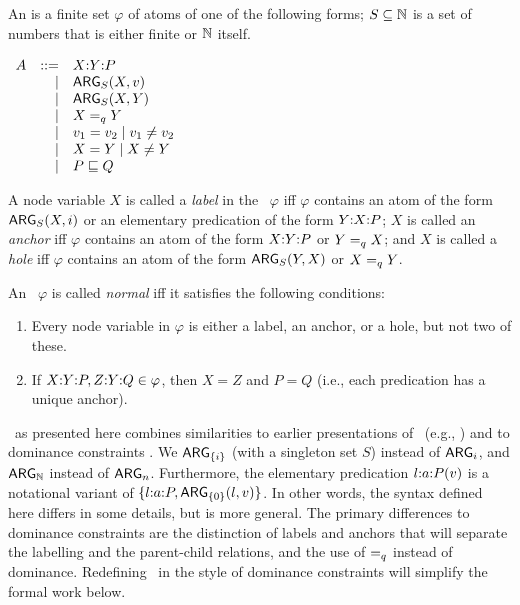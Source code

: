 \begin{definition}\label{defn:rmrs-syntax}
  An \emph{\rmrs} is a finite set $\varphi$ of atoms of one of the
  following forms; $S \subseteq \mathbb{N}$ is a set of numbers that is either
  finite or $\mathbb{N}$ itself.

$\begin{array}{rrll}
A &::= &\ep{X}{Y}{P} \\ %
&| &\ARG_S(X,v) \\ %
&| &\ARG_S(X,Y) \\ %
&| &X \qeq Y \\ %
&| &v_1 = v_2 \;|\; v_1 \neq v_2 \\ %
&| &X = Y \;|\; X \neq Y \\ %
&| &P \spec Q %
\end{array}
$

A node variable $X$ is called a \emph{label} in the \rmrs\
$\varphi$ iff $\varphi$ contains an atom of the form $\mathsf{ARG}_S(X,i)$ or
an elementary predication of the form $Y {:} X {:} P$; $X$ is called an
\emph{anchor} iff $\varphi$ contains an atom of the form
$X {:} Y {:} P$ or $Y =_q X$; and $X$ is called a \emph{hole} iff
$\varphi$ contains an atom of the form $\mathsf{ARG}_S(Y,X)$ or $X =_q Y$.

An \rmrs\ $\varphi$ is called \emph{normal} iff it satisfies the
following conditions:
\begin{enumerate}
\item Every node variable in $\varphi$ is either a label, an anchor,
  or a hole, but not two of these.
\item If $X {:} Y {:} P, Z {:} Y {:} Q\in \varphi$, then $X=Z$ and $P=Q$
  (i.e., each predication has a unique anchor).
\end{enumerate}
\end{definition}

\rmrs\ as presented here combines similarities to earlier
presentations of \rmrs\ (e.g., \cite{copestake:2003}) and to dominance
constraints \cite{egg:etal:2001}.  We $\mathsf{ARG}_{\{i\}}$ (with a singleton
set $S$) instead of $\mathsf{ARG}_i$, and $\mathsf{ARG}_{\mathbb{N}}$ instead of $\mathsf{ARG}_n$.
Furthermore, the elementary predication $l {:} a {:} P(v)$ is a
notational variant of $\{l {:} a {:} P, \mathsf{ARG}_{\{0\}}(l,v)\}$.  In other
words, the syntax defined here differs in some details, but is more
general. The primary differences to dominance constraints are the
distinction of labels and anchors that will separate the labelling and
the parent-child relations, and the use of $=_q$ instead of
dominance.  Redefining \rmrs\ in the style of dominance constraints
will simplify the formal work below.

